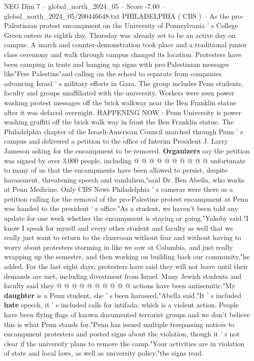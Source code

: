 \begin{textsample}{NEG Dim 7 – global\_north\_2024\_05 – Score -7.00 – global\_north\_2024\_05/200446648.txt}  \label{ex:f7_neg_190}
PHILADELPHIA ( CBS ) -- As the pro-Palestinian protest encampment on the University of Pennsylvania ' s College Green enters its eighth day, Thursday was already set to be an active day on campus.
A march and counter-demonstration took place and a traditional junior class ceremony and walk through campus changed its location.
Protesters have been camping in tents and hanging up signs with pro-Palestinian messages like"Free Palestine"and calling on the school to separate from companies advancing Israel ' s military efforts in Gaza.
The group includes Penn students, faculty and groups unaffiliated with the university.
Workers were seen power washing protest messages off the brick walkway near the Ben Franklin statue after it was defaced overnight.
HAPPENING NOW : Penn University is power washing graffiti off the brick walk way in front the Ben Franklin statue.
The Philadelphia chapter of the Israeli-American Council marched through Penn ' s campus and delivered a petition to the office of Interim President J.
Larry Jameson asking for the encampment to be removed. \textbf{Organizers} say the petition was signed by over 3,000 people, including @ @ @ @ @ @ @ @ @ @ unfortunate to many of us that the encampments have been allowed to persist, despite harassment, threatening speech and vandalism,"said Dr.
Ben Abella, who works at Penn Medicine.
Only CBS News Philadelphia ' s cameras were there as a petition calling for the removal of the pro-Palestine protest encampment at Penn was handed to the president ' s office."As a student, we haven't been told any update for one week whether the encampment is staying or going,"Yakoby said."I know I speak for myself and every other student and faculty as well that we really just want to return to the classroom without fear and without having to worry about protesters storming in like we saw at Columbia, and just really wrapping up the semester, and then working on building back our community,"he added.
For the last eight days, protesters have said they will not leave until their demands are met, including divestment from Israel.
Many Jewish students and faculty said they @ @ @ @ @ @ @ @ @ @ actions have been antisemitic."My \textbf{daughter} is a Penn student, she ' s been harassed,"Abella said."It ' s included \textbf{hate} speech, it ' s included calls for intifada, which is a violent action.
People have been flying flags of known documented terrorist groups and we don't believe this is what Penn stands for."Penn has issued multiple trespassing notices to encampment protesters and posted signs about the violation, though it ' s not clear if the university plans to remove the camp."Your activities are in violation of state and local laws, as well as university policy,"the signs read.

\end{textsample}
